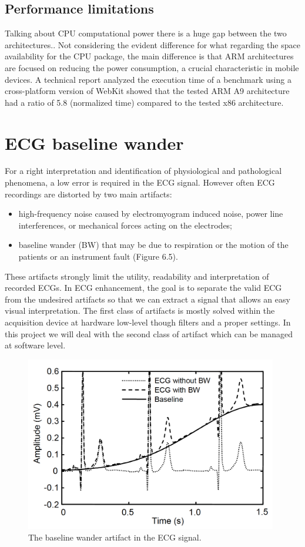 \subsection{Performance limitations}
Talking about CPU computational power there is a huge gap between the two architectures.. Not considering the evident difference for what regarding the space availability for the CPU package, the main difference is that ARM architectures are focused on reducing the power consumption, a crucial characteristic in mobile devices. A technical report analyzed the execution time of a benchmark using a cross-platform version of WebKit showed that the tested ARM A9 architecture had a ratio of 5.8 (normalized time) compared to the tested x86 architecture.\cite{ref11}

\section{ECG baseline wander}
For a right interpretation and identification of physiological and pathological phenomena, a low error is required in the ECG signal. However often ECG recordings are distorted by two main artifacts:
\begin{itemize}
	\item high-frequency noise caused by electromyogram induced noise, power line interferences, or mechanical forces acting on the electrodes;
	\item baseline wander (BW) that may be due to respiration or the motion of the patients or an instrument fault (Figure 6.5).
\end{itemize}
These artifacts strongly limit the utility, readability and interpretation of recorded ECGs. In ECG enhancement, the goal is to separate the valid ECG from the undesired artifacts so that we can extract a signal that allows an easy visual interpretation.\cite{ref12}
The first class of artifacts is mostly solved within the acquisition device at hardware low-level though filters and a proper settings. In this project we will deal with the second class of artifact which can be managed at software level.
\begin{figure}[ht!]
	\centering
	\includegraphics[width=110mm]{figures/ch6/5.png}
	\caption{The baseline wander artifact in the ECG signal.}
	\label{fig6.5}
\end{figure}

